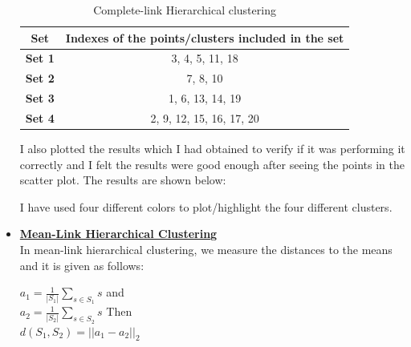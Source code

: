 \documentclass[11pt]{article}
\begin{document}
\begin{itemize}
		\begin{table}[h]
			\centering
			\begin{tabular}{|c|c|}
				\hline
				\textbf{Set}  & \textbf{Indexes of the points/clusters included in the set} \\
				\hline
				\textbf{Set 1}  & 3, 4, 5, 11, 18\\
				\hline
				\textbf{Set 2} & 7, 8, 10   \\
				\hline
				\textbf{Set 3} &  1, 6, 13, 14, 19   \\
				\hline
				\textbf{Set 4}  & 2, 9, 12, 15, 16, 17, 20   \\
				\hline
			\end{tabular}
			\caption{Complete-link Hierarchical clustering }
			\label{t2}
		\end{table}
		
	
	I also plotted the results which I had obtained to verify if it was performing it correctly and I felt the results were good enough after seeing the points in the scatter plot. The results are shown below:
	
	\begin{figure}[H]%
		\centering
	\end{figure}
	
	I have used four different colors to plot/highlight the four different clusters.
	
	\item[] \underline{\textbf{Mean-Link Hierarchical Clustering}}\\
	
	In mean-link hierarchical clustering, we measure the distances to the means and it is given  as follows:
	\begin{center}
		
		$a_1 = \frac{1}{|S_1|} \sum_{s \in S_1}^{} s $ and \\
		$a_2 =\frac{1}{|S_2|} \sum_{s \in S_2}^{} s $ Then \\
		$d(S_1,S_2)=  || a_1 -a_2||_2$
	\end{center}
	

\end{itemize}
\end{document}
